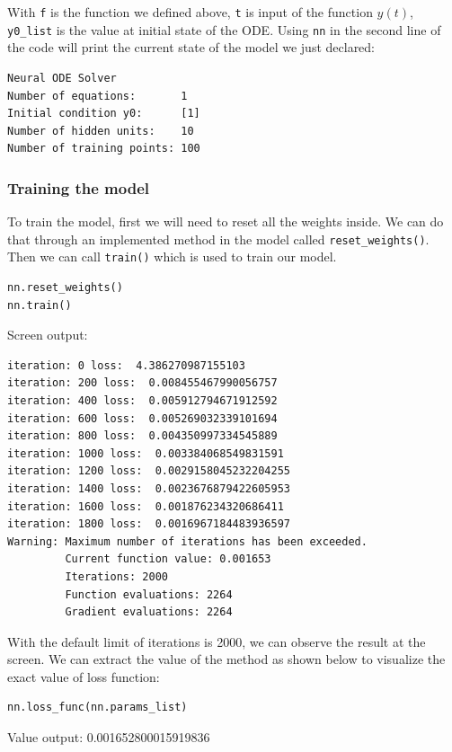 \documentclass[a4paper]{article}
\numberwithin{equation}{section}
\begin{document}
With \texttt{f} is the function we defined above, \texttt{t} is input of the function \( y(t) \), \texttt{y0\_list} is the value at initial state of the ODE. Using \texttt{nn} in the second line of the code will print the current state of the model we just declared:
\begin{mdframed}[leftline=false,rightline=false,backgroundcolor=Turquoise!10,nobreak=true]
  \begin{verbatim}
Neural ODE Solver
Number of equations:       1
Initial condition y0:      [1]
Number of hidden units:    10
Number of training points: 100
    \end{verbatim}
\end{mdframed}

\subsubsection{Training the model}
To train the model, first we will need to reset all the weights inside. We can do that through an implemented method in the model called \texttt{reset\_weights()}. Then we can call \texttt{train()} which is used to train our model.
\begin{mdframed}[leftline=false,rightline=false,backgroundcolor=magenta!10,nobreak=true]
  \begin{verbatim}
nn.reset_weights()
nn.train()
    \end{verbatim}
\end{mdframed}
Screen output:
\begin{mdframed}[leftline=false,rightline=false,backgroundcolor=Turquoise!10,nobreak=true]
  \begin{verbatim}
iteration: 0 loss:  4.386270987155103
iteration: 200 loss:  0.008455467990056757
iteration: 400 loss:  0.005912794671912592
iteration: 600 loss:  0.005269032339101694
iteration: 800 loss:  0.004350997334545889
iteration: 1000 loss:  0.003384068549831591
iteration: 1200 loss:  0.0029158045232204255
iteration: 1400 loss:  0.0023676879422605953
iteration: 1600 loss:  0.001876234320686411
iteration: 1800 loss:  0.0016967184483936597
Warning: Maximum number of iterations has been exceeded.
         Current function value: 0.001653
         Iterations: 2000
         Function evaluations: 2264
         Gradient evaluations: 2264
    \end{verbatim}
\end{mdframed}
With the default limit of iterations is 2000, we can observe the result at the screen. We can extract the value of the method as shown below to visualize the exact value of loss function:
\begin{mdframed}[leftline=false,rightline=false,backgroundcolor=magenta!10,nobreak=true]
  \begin{verbatim}
nn.loss_func(nn.params_list)
    \end{verbatim}
\end{mdframed}
Value output: 0.001652800015919836
\end{document}
